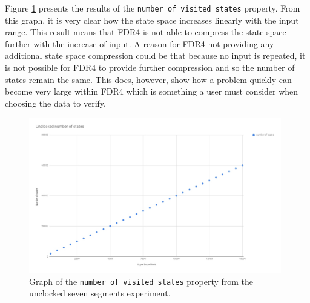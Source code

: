 Figure \ref{fig:unclocked_states} presents the results of the \texttt{number of visited states} property. From this graph, it is very clear how the state space increases linearly with the input range. This result means that FDR4 is not able to compress the state space further with the increase of input. A reason for FDR4 not providing any additional state space compression could be that because no input is repeated, it is not possible for FDR4 to provide further compression and so the number of states remain the same. This does, however, show how a problem quickly can become very large within FDR4 which is something a user must consider when choosing the data to verify.
\begin{figure}
    \includegraphics[width=0.98\textwidth]{./figures/temporary_graphs/unclocked_number_of_states.jpg}
\caption{Graph of the \texttt{number of visited states} property from the unclocked seven segments experiment.}
\label{fig:unclocked_states}
\end{figure}
